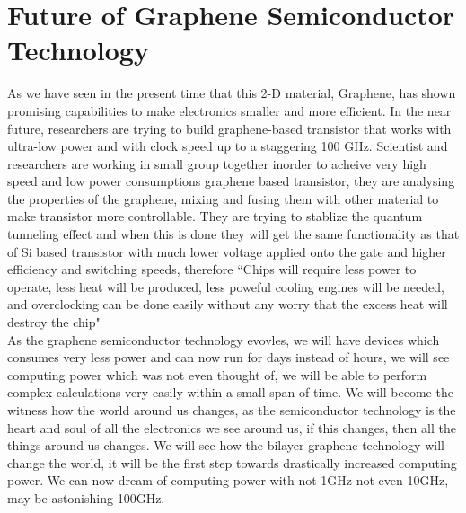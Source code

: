 \documentclass[conference]{IEEEtran}
\begin{document}
\section{\textbf{Future of Graphene Semiconductor Technology}}
As we have seen in the present time that this 2-D material, Graphene, has shown promising capabilities to make electronics smaller and more efficient. In the near future, researchers are trying to build graphene-based transistor that works with ultra-low power and with clock speed up to a staggering 100 GHz. Scientist and researchers are working in small group together inorder to acheive very high speed and low power consumptions graphene based transistor, they are analysing the properties of the graphene, mixing and fusing them with other material to make transistor more controllable. They are trying to stablize the quantum tunneling effect and when this is done they will get the same functionality as that of Si based transistor with much lower voltage applied onto the gate and higher efficiency and switching speeds, therefore ``Chips will require less power to operate, less heat will be produced, less poweful cooling engines will be needed, and overclocking can be done easily without any worry that the excess heat will destroy the chip"
\\

As the graphene semiconductor technology evovles, we will have devices which consumes very less power and can now run for days instead of hours, we will see computing power which was not even thought of, we will be able to perform complex calculations very easily within a small span of time. We will become the witness how the world around us changes, as the semiconductor technology is the heart and soul of all the electronics we see around us, if this changes, then all the things around us changes. We will see how the bilayer graphene technology will change the world, it will be the first step towards drastically increased computing power. We can now dream of computing power with not 1GHz not even 10GHz, may be astonishing 100GHz.
\\
\end{document}
